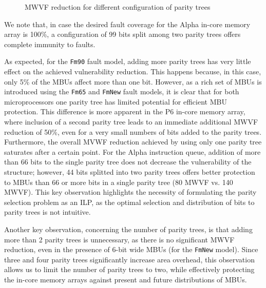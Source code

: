 \documentclass[12pt]{yalephd}
\begin{document}
\begin{figure}[!ht]
    \centering
    \vspace{.1in}
\caption{MWVF reduction for different configuration of parity trees}
\label{fMWVFresults}
\end{figure}

We note that, in case the desired fault coverage for the Alpha in-core memory array is 100\%, a configuration of 99 bits split among two parity trees offers complete immunity to faults.

 As expected, for the {\tt Fm90} fault model, adding more parity trees has very little effect on the achieved vulnerability reduction. This happens because, in this case, only 5\% of the MBUs affect more than one bit. However, as a rich set of MBUs is introduced using the {\tt Fm65} and {\tt FmNew} fault models, it is clear that for both microprocessors one parity tree has limited potential for efficient MBU protection. This difference is more apparent in the P6 in-core memory array, where inclusion of a second parity tree leads to an immediate additional MWVF reduction of 50\%, even for a very small numbers of bits added to the parity trees. Furthermore, the overall MVWF reduction achieved by using only one parity tree saturates after a certain point. For the Alpha instruction queue, addition of more than 66 bits to the single parity tree does not decrease the vulnerability of the structure; however, 44 bits splitted into two parity trees offers better protection to MBUs than 66 or more bits in a single parity tree (80 MWVF vs. 140 MWVF). This key observation highlights the necessity of formulating the parity selection problem as an ILP, as the optimal selection and distribution of bits to parity trees is not intuitive.

Another key observation, concerning the number of parity trees, is that adding more than 2 parity trees is unnecessary, as there is no significant MWVF reduction, even in the presence of 6-bit wide MBUs (for the {\tt FmNew} model). Since three and four parity trees significantly increase area overhead, this observation allows us to limit the number of parity trees to two, while effectively protecting the in-core memory arrays against present and future distributions of MBUs.
\end{document}
